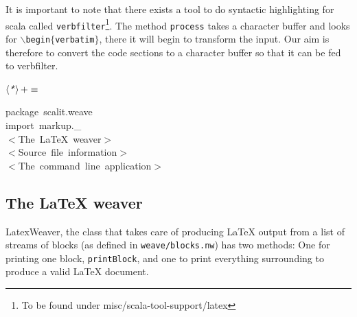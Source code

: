 \documentclass[a4paper,12pt]{article}
\begin{document}
It is important to note that there exists a tool to do syntactic
highlighting for scala called \texttt{verbfilter}\footnote{To be found under
misc/scala-tool-support/latex}. The method \texttt{process} takes a character
buffer and looks for \texttt{$\backslash$begin$\{$verbatim$\}$}, there it will begin to transform
the input. Our aim is therefore to convert the code sections to a character
buffer so that it can be fed to verbfilter.

$\left<\mbox{\emph{*}}\right>+\equiv$
\begin{program}{\vem package}~scalit.weave
\\{\vem import}~markup.\_
\\[0.5em]$<$The~LaTeX~weaver$>$
\\[0.5em]$<$Source~file~information$>$
\\[0.5em]$<$The~command~line~application$>$
\\[0.5em]\end{program}
\subsection{The LaTeX weaver}
LatexWeaver, the class that takes care of producing LaTeX output from a list of
streams of blocks (as defined in \texttt{weave/blocks.nw}) has two methods: One for
printing one block, \texttt{printBlock}, and one to print everything surrounding
to produce a valid LaTeX document.
\end{document}
